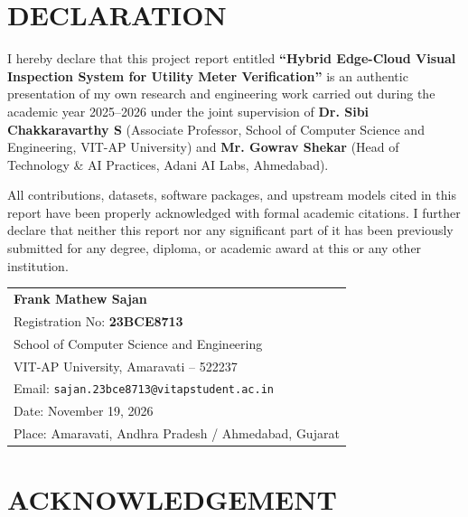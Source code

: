 \documentclass[12pt,a4paper,oneside]{report}
\begin{document}
\clearpage

\chapter*{DECLARATION}
\thispagestyle{plain}

I hereby declare that this project report entitled \textbf{``Hybrid Edge-Cloud Visual Inspection System for Utility Meter Verification''} is an authentic presentation of my own research and engineering work carried out during the academic year 2025--2026 under the joint supervision of \textbf{Dr. Sibi Chakkaravarthy S} (Associate Professor, School of Computer Science and Engineering, VIT-AP University) and \textbf{Mr. Gowrav Shekar} (Head of Technology \& AI Practices, Adani AI Labs, Ahmedabad).

All contributions, datasets, software packages, and upstream models cited in this report have been properly acknowledged with formal academic citations. I further declare that neither this report nor any significant part of it has been previously submitted for any degree, diploma, or academic award at this or any other institution.

\vspace{1.8cm}
\noindent
\begin{tabular}{@{}l@{}}
\textbf{Frank Mathew Sajan} \\
Registration No: \textbf{23BCE8713} \\
School of Computer Science and Engineering \\
VIT-AP University, Amaravati -- 522237 \\
Email: \texttt{sajan.23bce8713@vitapstudent.ac.in} \\
Date: November 19, 2026 \\
Place: Amaravati, Andhra Pradesh / Ahmedabad, Gujarat
\end{tabular}

\clearpage

\chapter*{ACKNOWLEDGEMENT}
\thispagestyle{plain}
\end{document}
